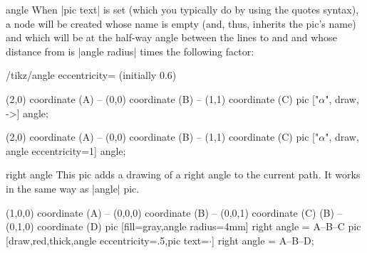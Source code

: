 \begin{pictype}{angle}{}
    When |pic text| is set (which you typically do by using the quotes syntax),
    a node will be created whose name is empty (and, thus, inherits the pic's
    name) and which will be at the half-way angle between the lines to 
    and  and whose distance from  is |angle radius| times the
    following factor:
    \begin{key}{/tikz/angle eccentricity= (initially 0.6)}
\begin{codeexample}[]
\tikz \draw (2,0) coordinate (A) -- (0,0) coordinate (B)
         -- (1,1) coordinate (C)
  pic ["$\alpha$", draw, ->] {angle};
\end{codeexample}
\begin{codeexample}[]
\tikz \draw (2,0) coordinate (A) -- (0,0) coordinate (B)
         -- (1,1) coordinate (C)
  pic ["$\alpha$", draw, angle eccentricity=1] {angle};
\end{codeexample}
\begin{codeexample}[]
\end{codeexample}
    \end{key}
\end{pictype}

\begin{pictype}{right angle}{}
    This pic adds a drawing of a right angle to the current path. It works in
    the same way as |angle| pic.
\begin{codeexample}[]
  \tikz
    \draw (1,0,0) coordinate (A) -- (0,0,0) coordinate (B) -- (0,0,1) coordinate (C)
      (B) -- (0,1,0) coordinate (D)
      pic [fill=gray,angle radius=4mm] {right angle = A--B--C}
      pic [draw,red,thick,angle eccentricity=.5,pic text=$\cdot$]
        {right angle = A--B--D};
\end{codeexample}
\end{pictype}


